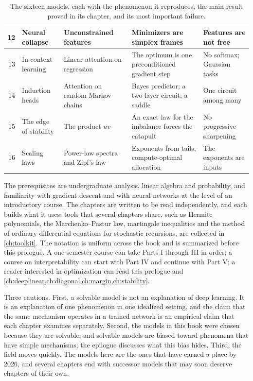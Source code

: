 \begin{refsection}
\begin{table}[p]
\begin{fullwidth}
\begin{tabular}{@{}r>{\raggedright\arraybackslash}p{28mm}>{\raggedright\arraybackslash}p{33mm}>{\raggedright\arraybackslash}p{41mm}>{\raggedright\arraybackslash}p{38mm}@{}}
12 & Neural collapse & Unconstrained features & Minimizers are simplex frames & Features are not free\\
\midrule
13 & In-context learning & Linear attention on regression & The optimum is one preconditioned gradient step & No softmax; Gaussian tasks\\
14 & Induction heads & Attention on random Markov chains & Bayes predictor; a two-layer circuit; a saddle & One circuit among many\\
\midrule
15 & The edge of stability & The product $uv$ & An exact law for the imbalance forces the catapult & No progressive sharpening\\
16 & Scaling laws & Power-law spectra and Zipf's law & Exponents from tails; compute-optimal allocation & The exponents are inputs\\
\bottomrule
\end{tabular}
\caption{The sixteen models, each with the phenomenon it reproduces, the main result proved in its chapter, and its most important failure.}
\label{tab:prologue:map}
\end{fullwidth}
\end{table}


The prerequisites are undergraduate analysis, linear algebra and probability, and familiarity with gradient descent and with neural networks at the level of an introductory course. The chapters are written to be read independently, and each builds what it uses; tools that several chapters share, such as Hermite polynomials, the Marchenko--Pastur law, martingale inequalities and the method of ordinary differential equations for stochastic recursions, are collected in \cref{ch:toolkit}. The notation is uniform across the book and is summarized before this prologue. A one-semester course can take Parts I through III in order; a course on interpretability can start with Part IV and continue with Part V; a reader interested in optimization can read this prologue and \cref{ch:deeplinear,ch:diagonal,ch:margin,ch:stability}.

Three cautions. First, a solvable model is not an explanation of deep learning. It is an explanation of one phenomenon in one idealized setting, and the claim that the same mechanism operates in a trained network is an empirical claim that each chapter examines separately. Second, the models in this book were chosen because they are solvable, and solvable models are biased toward phenomena that have simple mechanisms; the epilogue discusses what this bias hides. Third, the field moves quickly. The models here are the ones that have earned a place by 2026, and several chapters end with successor models that may soon deserve chapters of their own.


\end{refsection}
